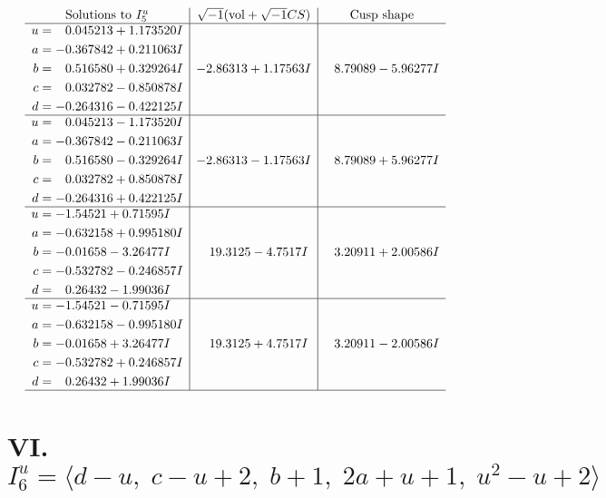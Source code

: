 \documentclass[1p]{elsarticle_modified}
\theoremstyle{definition}
\newcommand{\I}{\sqrt{-1}}
\begin{document}
$$\begin{array}{c|c|c}  
\text{Solutions to }I^u_{5}& \I (\text{vol} + \sqrt{-1}CS) & \text{Cusp shape}\\
 \hline 
\begin{aligned}
u &= \phantom{-}0.045213 + 1.173520 I \\
a &= -0.367842 + 0.211063 I \\
b &= \phantom{-}0.516580 + 0.329264 I \\
c &= \phantom{-}0.032782 - 0.850878 I \\
d &= -0.264316 - 0.422125 I\end{aligned}
 & -2.86313 + 1.17563 I & \phantom{-}8.79089 - 5.96277 I \\ \hline\begin{aligned}
u &= \phantom{-}0.045213 - 1.173520 I \\
a &= -0.367842 - 0.211063 I \\
b &= \phantom{-}0.516580 - 0.329264 I \\
c &= \phantom{-}0.032782 + 0.850878 I \\
d &= -0.264316 + 0.422125 I\end{aligned}
 & -2.86313 - 1.17563 I & \phantom{-}8.79089 + 5.96277 I \\ \hline\begin{aligned}
u &= -1.54521 + 0.71595 I \\
a &= -0.632158 + 0.995180 I \\
b &= -0.01658 - 3.26477 I \\
c &= -0.532782 - 0.246857 I \\
d &= \phantom{-}0.26432 - 1.99036 I\end{aligned}
 & \phantom{-}19.3125 - 4.7517 I & \phantom{-}3.20911 + 2.00586 I \\ \hline\begin{aligned}
u &= -1.54521 - 0.71595 I \\
a &= -0.632158 - 0.995180 I \\
b &= -0.01658 + 3.26477 I \\
c &= -0.532782 + 0.246857 I \\
d &= \phantom{-}0.26432 + 1.99036 I\end{aligned}
 & \phantom{-}19.3125 + 4.7517 I & \phantom{-}3.20911 - 2.00586 I\\
 \hline 
 \end{array}$$\newpage\newpage\renewcommand{\arraystretch}{1}
\centering \section*{VI. $I^u_{6}= \langle d- u,\;c- u+2,\;b+1,\;2 a+u+1,\;u^2- u+2 \rangle$}
\end{document}
